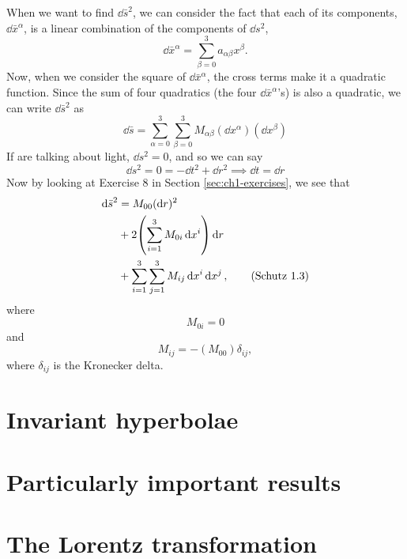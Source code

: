 \documentclass[gr-notes.tex]{subfiles}
\begin{document}
When we want to find $\dd{\bar{s}}^2$, we can consider the fact that each of its components, $\dd{\bar{x}^\alpha}$, is a linear combination of the components of $\dd{s}^2$,
%
\begin{displaymath}
  \dd{\bar{x}^\alpha} = \sum_{\beta=0}^3 a_{\alpha\beta} x^\beta.
\end{displaymath}
%
Now, when we consider the square of $\dd{\bar{x}^\alpha}$, the cross terms make it a quadratic function. Since the sum of four quadratics (the four $\dd{\bar{x}^\alpha}$'s) is also a quadratic, we can write $\dd{\bar{s}}^2$ as
%
\begin{displaymath}
  \dd{\bar{s}} =
  \sum_{\alpha=0}^3 \sum_{\beta=0}^3
      M_{\alpha\beta} (\dd{x^\alpha}) (\dd{x^\beta})
%
  \tag{Schutz 1.2}
  \label{schutz:1.2}
\end{displaymath}
%
If are talking about light, $\dd{s}^2 = 0$, and so we can say
%
\begin{displaymath}
  \dd{s}^2 = 0 = -\dd{t}^2 + \dd{r}^2
  \implies
  \dd{t} = \dd{r}
\end{displaymath}
%
Now by looking at Exercise 8 in Section \ref{sec:ch1-exercises}, we see that
\begin{align*}
  \dd{\bar{s}}^2 &=
  M_{00} (\dd{r})^2
  \\ &+
  2 \qty( \sum_{i=1}^3 M_{0i} \dd{x^i} ) \dd{r}
  \\ &+
  \sum_{i=1}^3 \sum_{j=1}^3 M_{ij} \dd{x^i} \dd{x^j},
  \tag{Schutz 1.3}
  \label{schutz:1.3}
\end{align*}
%
where
\begin{displaymath}
  M_{0i} = 0
%
  \tag{Schutz 1.4a}
  \label{schutz:1.4a}
\end{displaymath}
%
and
%
\begin{displaymath}
  M_{ij} = -(M_{00}) \delta_{ij},
%
  \tag{Schutz 1.4b}
  \label{schutz:1.4b}
\end{displaymath}
%
where $\delta_{ij}$ is the Kronecker delta.


\section{Invariant hyperbolae}

\section{Particularly important results}

\section{The Lorentz transformation}
\end{document}
